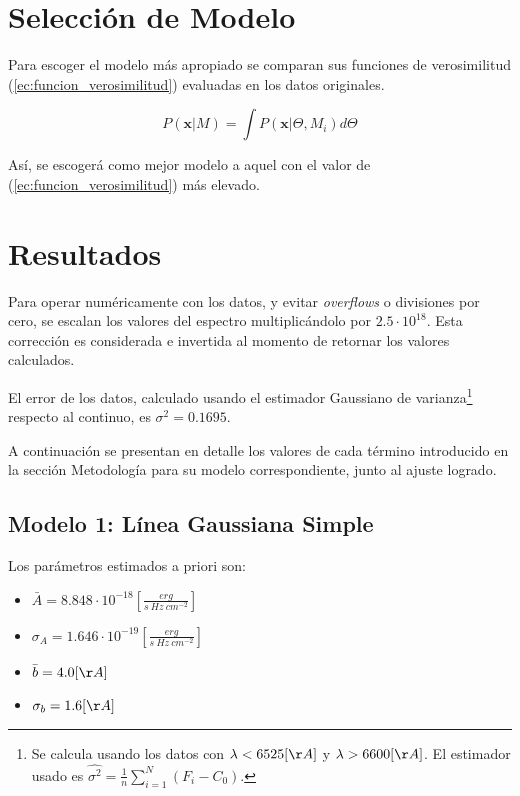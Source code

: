 \documentclass{article}
\renewcommand{\vec}[1]{\mathbf{#1}}
\begin{document}
\section{Selección de Modelo}

Para escoger el modelo más apropiado se comparan sus funciones de verosimilitud (\ref{ec:funcion_verosimilitud}) evaluadas en los datos originales.

\begin{equation}
  P(\vec{x}|M) = \int P(\vec{x}|\Theta, M_i) d\Theta
  \label{ec:funcion_verosimilitud}
\end{equation}

Así, se escogerá como mejor modelo a aquel con el valor de (\ref{ec:funcion_verosimilitud}) más elevado.

\section{Resultados}

Para operar numéricamente con los datos, y evitar \emph{overflows} o divisiones por cero, se escalan los valores del espectro multiplicándolo por $2.5 \cdot 10^{18}$. Esta corrección es considerada e invertida al momento de retornar los valores calculados.

El error de los datos, calculado usando el estimador Gaussiano de varianza\footnote{Se calcula usando los datos con $\lambda < 6525[\AA]$ y $\lambda > 6600[\AA]$. El estimador usado es $\hat{\sigma^2} = \frac{1}{n} \sum\limits_{i=1}^N (F_i - C_0)$.} respecto al continuo, es $\sigma^2 = 0.1695$.

A continuación se presentan en detalle los valores de cada término introducido en la sección Metodología para su modelo correspondiente, junto al ajuste logrado. 

\subsection{Modelo 1: Línea Gaussiana Simple}

Los parámetros estimados a priori son:

\begin{itemize}
  \item $ \bar{A} = 8.848 \cdot 10^{-18} [\frac{erg}{s\ Hz\ cm^{-2}}]$
  
  \item $ \sigma_A = 1.646 \cdot 10^{-19} [\frac{erg}{s\ Hz\ cm^{-2}}]$
  
  \item $ \bar{b} = 4.0 [\AA] $
  
  \item $ \sigma_b = 1.6 [\AA] $
\end{itemize}
\end{document}
